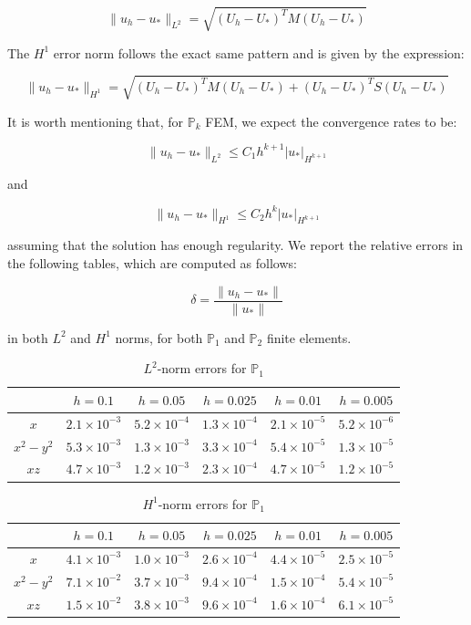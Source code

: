 \documentclass{article}
\theoremstyle{definition}
\theoremstyle{proposition}
\theoremstyle{theorem}
\theoremstyle{remark}
\theoremstyle{corollary}  %
\theoremstyle{exercise}
\theoremstyle{lemma}
\begin{document}
$$\|u_h - u_*\|_{L^2} = \sqrt{(U_h - U_*)^TM(U_h - U_*)}$$

The $H^1$ error norm follows the exact same pattern and is given by the expression:

$$\|u_h - u_*\|_{H^1} = \sqrt{(U_h - U_*)^TM(U_h - U_*) + (U_h - U_*)^TS(U_h - U_*)}$$

It is worth mentioning that, for $\mathbb{P}_k$ FEM, we expect the convergence rates to be:

$$\|u_h - u_*\|_{L^2} \leq C_{1}h^{k+1}|u_*|_{H^{k+1}}$$

and 

$$\|u_h - u_*\|_{H^1} \leq C_{2}h^{k}|u_*|_{H^{k+1}}$$


assuming that the solution has enough regularity. We report the relative errors in the following tables, which are computed as follows:

$$\delta = \frac{\|u_h - u_*\|}{\|u_*\|}$$

in both $L^2$ and $H^1$ norms, for both $\mathbb{P}_1$ and $\mathbb{P}_2$ finite elements.

\begin{table}[H]
\centering
\begin{tabular}{|c|c|c|c|c|c|}
\hline
 & $h = 0.1$ & $h = 0.05$ & $h = 0.025$ & $h = 0.01$ & $h = 0.005$ \\
\hline
$x$ & $2.1 \times10^{-3}$ & $5.2 \times10^{-4}$ & $1.3 \times10^{-4}$ & $2.1 \times10^{-5}$ & $5.2\times10^{-6}$ \\
\hline
$x^2 - y^2$ & $5.3 \times10^{-3}$ & $1.3 \times10^{-3}$ & $3.3 \times10^{-4}$ & $5.4 \times10^{-5}$ & $1.3 \times10^{-5}$ \\
\hline
$xz$ & $4.7 \times10^{-3}$ & $1.2 \times10^{-3}$ & $2.3 \times10^{-4}$ & $4.7 \times10^{-5}$ & $1.2 \times10^{-5}$ \\
\hline
\end{tabular}
\caption{$L^2$-norm errors for $\mathbb{P}_1$}
\end{table}

\begin{table}[H]
\centering
\begin{tabular}{|c|c|c|c|c|c|}
\hline
 & $h = 0.1$ & $h = 0.05$ & $h = 0.025$ & $h = 0.01$ & $h = 0.005$ \\
\hline
$x$ & $4.1 \times10^{-3}$ & $1.0 \times10^{-3}$ & $2.6 \times10^{-4}$ & $4.4 \times10^{-5}$ & $2.5 \times10^{-5}$ \\
\hline
$x^2 - y^2$ & $7.1 \times10^{-2}$ & $3.7 \times10^{-3}$ & $9.4 \times10^{-4}$ & $1.5 \times10^{-4}$ & $5.4 \times10^{-5}$ \\
\hline
$xz$ & $1.5 \times10^{-2}$ & $3.8 \times10^{-3}$ & $9.6 \times10^{-4}$ & $1.6 \times10^{-4}$ & $6.1 \times10^{-5}$ \\
\hline
\end{tabular}
\caption{$H^1$-norm errors for $\mathbb{P}_1$}
\end{table}
\end{document}
